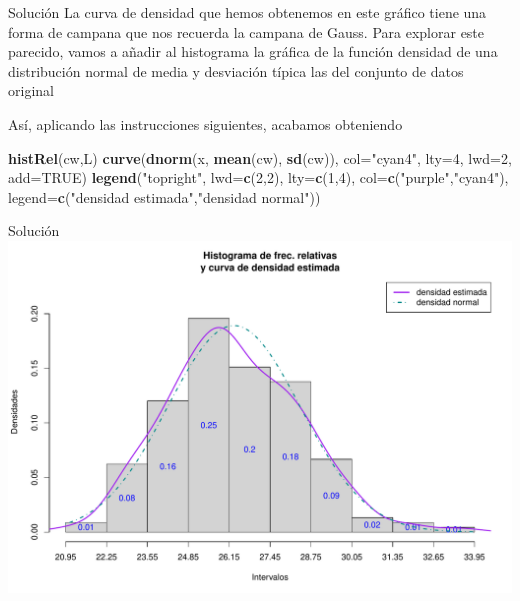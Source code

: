\documentclass[
  ignorenonframetext,
]{beamer}
\newenvironment{Shaded}{\begin{snugshade}}{\end{snugshade}}
\newcommand{\AttributeTok}[1]{\textcolor[rgb]{0.13,0.29,0.53}{#1}}
\newcommand{\ConstantTok}[1]{\textcolor[rgb]{0.56,0.35,0.01}{#1}}
\newcommand{\DecValTok}[1]{\textcolor[rgb]{0.00,0.00,0.81}{#1}}
\newcommand{\FunctionTok}[1]{\textcolor[rgb]{0.13,0.29,0.53}{\textbf{#1}}}
\newcommand{\NormalTok}[1]{#1}
\newcommand{\StringTok}[1]{\textcolor[rgb]{0.31,0.60,0.02}{#1}}
\begin{document}
\begin{frame}[fragile]{Solución}
\label{soluciuxf3n-45}
La curva de densidad que hemos obtenemos en este gráfico tiene una forma
de campana que nos recuerda la campana de Gauss. Para explorar este
parecido, vamos a añadir al histograma la gráfica de la función densidad
de una distribución normal de media y desviación típica las del conjunto
de datos original

Así, aplicando las instrucciones siguientes, acabamos obteniendo

\begin{Shaded}
\begin{Highlighting}[]
\FunctionTok{histRel}\NormalTok{(cw,L)}
\FunctionTok{curve}\NormalTok{(}\FunctionTok{dnorm}\NormalTok{(x, }\FunctionTok{mean}\NormalTok{(cw), }\FunctionTok{sd}\NormalTok{(cw)), }\AttributeTok{col=}\StringTok{"cyan4"}\NormalTok{, }\AttributeTok{lty=}\DecValTok{4}\NormalTok{, }\AttributeTok{lwd=}\DecValTok{2}\NormalTok{,}
\AttributeTok{add=}\ConstantTok{TRUE}\NormalTok{)}
\FunctionTok{legend}\NormalTok{(}\StringTok{"topright"}\NormalTok{, }\AttributeTok{lwd=}\FunctionTok{c}\NormalTok{(}\DecValTok{2}\NormalTok{,}\DecValTok{2}\NormalTok{), }\AttributeTok{lty=}\FunctionTok{c}\NormalTok{(}\DecValTok{1}\NormalTok{,}\DecValTok{4}\NormalTok{), }\AttributeTok{col=}\FunctionTok{c}\NormalTok{(}\StringTok{"purple"}\NormalTok{,}\StringTok{"cyan4"}\NormalTok{),}
       \AttributeTok{legend=}\FunctionTok{c}\NormalTok{(}\StringTok{"densidad estimada"}\NormalTok{,}\StringTok{"densidad normal"}\NormalTok{))}
\end{Highlighting}
\end{Shaded}
\end{frame}

\begin{frame}{Solución}
\label{soluciuxf3n-46}
\includegraphics{R_base_files/figure-beamer/unnamed-chunk-253-1.pdf}
\end{frame}
\end{document}
